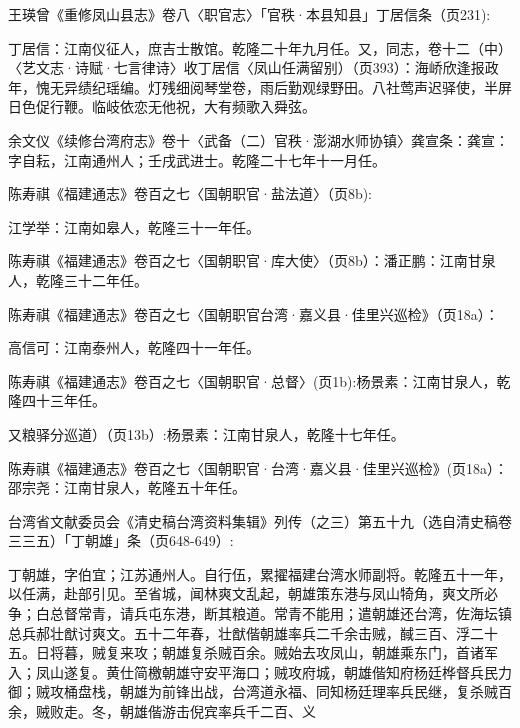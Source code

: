 \noindent 王瑛曾《重修凤山县志》卷八〈职官志〉「官秩·本县知县」丁居信条（页231):

丁居信：江南仪征人，庶吉士散馆。乾隆二十年九月任。又，同志，卷十二（中）〈艺文志·诗赋·七言律诗〉收丁居信〈凤山任满留别）（页393）：海峤欣逢报政年，愧无异绩纪瑶编。灯残细阅琴堂卷，雨后勤观绿野田。八社莺声迟驿使，半屏日色促行鞭。临岐依恋无他祝，大有频歌入舜弦。


\noindent 余文仪《续修台湾府志》卷十〈武备（二）官秩·澎湖水师协镇〉龚宣条：龚宣：字自耘，江南通州人；壬戌武进士。乾隆二十七年十一月任。


\noindent 陈寿祺《福建通志》卷百之七〈国朝职官·盐法道〉（页8b):

江学举：江南如皋人，乾隆三十一年任。


\noindent 陈寿祺《福建通志》卷百之七〈国朝职官·库大使〉（页8b）：潘正鹏：江南甘泉人，乾隆三十二年任。



\noindent 陈寿祺《福建通志》卷百之七〈国朝职官台湾·嘉义县·佳里兴巡检》（页18a）：

高信可：江南泰州人，乾隆四十一年任。


\noindent 陈寿祺《福建通志》卷百之七〈国朝职官·总督〉(页1b):杨景素：江南甘泉人，乾隆四十三年任。

又粮驿分巡道）（页13b）:杨景素：江南甘泉人，乾隆十七年任。


\noindent 陈寿祺《福建通志》卷百之七〈国朝职官·台湾·嘉义县·佳里兴巡检》(页18a）：邵宗尧：江南甘泉人，乾隆五十年任。


\noindent 台湾省文献委员会《清史稿台湾资料集辑》列传（之三）第五十九（选自清史稿卷三三五）「丁朝雄」条（页648-649）:

丁朝雄，字伯宜；江苏通州人。自行伍，累擢福建台湾水师副将。乾隆五十一年，以任满，赴部引见。至省城，闻林爽文乱起，朝雄策东港与凤山犄角，爽文所必争；白总督常青，请兵屯东港，断其粮道。常青不能用；遣朝雄还台湾，佐海坛镇总兵郝壮猷讨爽文。五十二年春，壮猷偕朝雄率兵二千余击贼，馘三百、浮二十五。日将暮，贼复来攻；朝雄复杀贼百余。贼始去攻凤山，朝雄乘东门，首诸军入；凤山遂复。黄仕简檄朝雄守安平海口；贼攻府城，朝雄偕知府杨廷桦督兵民力御；贼攻桶盘栈，朝雄为前锋出战，台湾道永福、同知杨廷理率兵民继，复杀贼百余，贼败走。冬，朝雄偕游击倪宾率兵千二百、义


